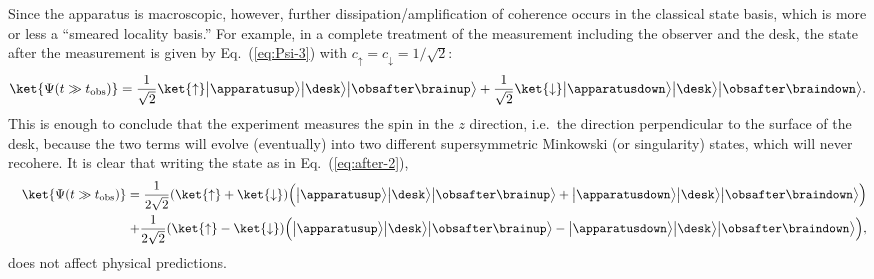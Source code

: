 \documentclass[12pt]{article}
\begin{document}
Since the apparatus is macroscopic, however, further dissipation/amplification 
of coherence occurs in the classical state basis, which is more or less 
a ``smeared locality basis.''  For example, in a complete 
treatment of the measurement including the observer and the desk, 
the state after the measurement is given by Eq.~(\ref{eq:Psi-3}) with 
$c_\uparrow = c_\downarrow = 1/\sqrt{2}$:
%
\begin{equation}
  \ket{\Psi(t \gg t_{\rm obs})} 
  = \frac{1}{\sqrt{2}} \ket{\uparrow} \bigl|\apparatusup\bigr> 
    \bigl|\desk\bigr> \bigl|\obsafter\brainup\bigr> 
    + \frac{1}{\sqrt{2}} \ket{\downarrow} \bigl|\apparatusdown\bigr> 
    \bigl|\desk\bigr> \bigl|\obsafter\braindown\bigr>.
\label{eq:after-3}
\end{equation}
%
This is enough to conclude that the experiment measures the spin in the 
$z$ direction, i.e.\ the direction perpendicular to the surface of the 
desk, because the two terms will evolve (eventually) into two different 
supersymmetric Minkowski (or singularity) states, which will never 
recohere.  It is clear that writing the state as in Eq.~(\ref{eq:after-2}),
%
\begin{eqnarray}
  && \ket{\Psi(t \gg t_{\rm obs})} 
  = \frac{1}{2\sqrt{2}} (\ket{\uparrow} + \ket{\downarrow}) 
    \Bigl( \bigl|\apparatusup\bigr> \bigl|\desk\bigr> 
    \bigl|\obsafter\brainup\bigr> + \bigl|\apparatusdown\bigr> 
    \bigl|\desk\bigr> \bigl|\obsafter\braindown\bigr> \Bigr) 
\nonumber\\
  && \qquad\qquad\qquad\,
    + \frac{1}{2\sqrt{2}} (\ket{\uparrow} - \ket{\downarrow}) 
    \Bigl( \bigl|\apparatusup\bigr> \bigl|\desk\bigr> 
    \bigl|\obsafter\brainup\bigr> - \bigl|\apparatusdown\bigr> 
    \bigl|\desk\bigr> \bigl|\obsafter\braindown\bigr> \Bigr),
\label{eq:after-4}
\end{eqnarray}
%
does not affect physical predictions.
\end{document}
